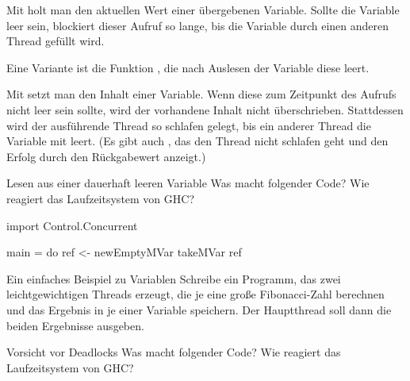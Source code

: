 \documentclass{uebblatt}
\begin{document}
Mit  holt man den aktuellen Wert
einer übergebenen Variable. Sollte die Variable leer sein, blockiert dieser
Aufruf so lange, bis die Variable durch einen anderen Thread gefüllt wird.

Eine Variante ist die Funktion , die
nach Auslesen der Variable diese leert.

Mit  setzt man den Inhalt einer
Variable. Wenn diese zum Zeitpunkt des Aufrufs nicht leer sein sollte, wird der
vorhandene Inhalt nicht überschrieben. Stattdessen wird der ausführende Thread
so schlafen gelegt, bis ein anderer Thread die Variable mit
 leert. (Es gibt auch , das den Thread nicht schlafen geht und den Erfolg durch den
Rückgabewert anzeigt.)

\begin{aufgabe}{Lesen aus einer dauerhaft leeren Variable}
Was macht folgender Code? Wie reagiert das Laufzeitsystem von GHC?

\begin{haskellcode}
import Control.Concurrent

main = do
    ref <- newEmptyMVar
    takeMVar ref
\end{haskellcode}
\end{aufgabe}

\begin{aufgabe}{Ein einfaches Beispiel zu Variablen}
Schreibe ein Programm, das zwei leichtgewichtigen Threads erzeugt, die je eine große
Fibonacci-Zahl berechnen und das Ergebnis in je einer Variable speichern. Der
Hauptthread soll dann die beiden Ergebnisse ausgeben.
\end{aufgabe}

\begin{aufgabe}{Vorsicht vor Deadlocks}
Was macht folgender Code? Wie reagiert das Laufzeitsystem von GHC?

\end{aufgabe}
\end{document}

